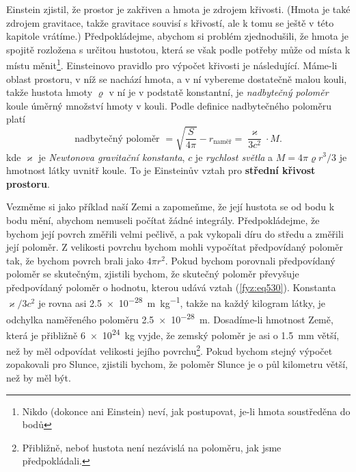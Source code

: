     Einstein zjistil, že prostor je zakřiven a hmota je zdrojem křivosti. (Hmota je také zdrojem 
    gravitace, takže gravitace souvisí s křivostí, ale k tomu se ještě v této kapitole vrátíme.) 
    Předpokládejme, abychom si problém zjednodušili, že hmota je spojitě rozložena s určitou 
    hustotou, která se však podle potřeby může od místa k místu měnit\footnote{Nikdo (dokonce ani 
    Einstein) neví, jak postupovat, je-li hmota soustředěna do bodů}. Einsteinovo pravidlo pro 
    výpočet křivosti je následující. Máme-li oblast prostoru, v níž se nachází hmota, a v ní 
    vybereme dostatečně malou kouli, takže hustota hmoty \(\varrho\) v ní je v podstatě konstantní, 
    je \emph{nadbytečný poloměr} koule úměrný množství hmoty v kouli. Podle definice nadbytečného 
    poloměru platí
    \begin{equation}\label{fyz:eq530}
      \text{nadbytečný poloměr } = \sqrt{\dfrac{S}{4\pi}} - r_\text{naměř} 
                                 = \dfrac{\varkappa}{3c^2}\cdot M.
    \end{equation}
    kde \(\varkappa\) je \emph{Newtonova gravitační konstanta}, \(c\) je \emph{rychlost světla} a 
    \(M=4\pi\varrho r^3/3\) je hmotnost látky uvnitř koule. To je Einsteinův vztah pro 
    \textbf{střední křivost prostoru}. 
    
    Vezměme si jako příklad naší Zemi a zapomeňme, že její hustota se od bodu k bodu mění, abychom 
    nemuseli počítat žádné integrály. Předpokládejme, že bychom její povrch změřili velmi pečlivě, 
    a pak vykopali díru do středu a změřili její poloměr. Z velikosti povrchu bychom mohli 
    vypočítat předpovídaný poloměr tak, že bychom povrch brali jako \(4\pi r^2\). Pokud bychom 
    porovnali předpovídaný poloměr se skutečným, zjistili bychom, že skutečný poloměr převyšuje 
    předpovídaný poloměr o hodnotu, kterou udává vztah (\ref{fyz:eq530}). Konstanta 
    \(\varkappa/3c^2\) 
    je rovna asi \qty{2.5e-28}{\m\per\kg}, takže na každý kilogram látky, je odchylka naměřeného 
    poloměru \qty{2.5e-28}{\m}. Dosadíme-li hmotnost Země, která je přibližně \qty{6e24}{\kg} vyjde, 
    že zemský poloměr je asi o \qty{1.5}{\mm} větší, než by měl odpovídat velikosti jejího 
    povrchu\footnote{Přibližně, neboť hustota není nezávislá na poloměru, jak jsme předpokládali.}. 
    Pokud bychom stejný výpočet zopakovali pro Slunce, zjistili bychom, že poloměr Slunce je o půl 
    kilometru větší, než by měl být. 
    
